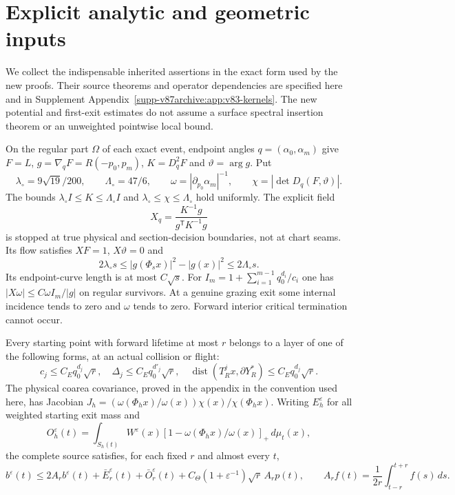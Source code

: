 \section{Explicit analytic and geometric inputs}
We collect the indispensable inherited assertions in the exact form
used by the new proofs. Their source theorems and operator dependencies
are specified here and in Supplement Appendix~\ref{supp-v87archive:app:v83-kernels}. The new
potential and first-exit estimates do not assume a surface spectral
insertion theorem or an unweighted pointwise local bound.

\begin{inputstatement}
\label{input:v83-geometric}
On the regular part $\Omega$ of each exact event, endpoint angles
$q=(\alpha_0,\alpha_m)$ give $F=L$, $g=\nabla_qF=R(-p_0,p_m)$,
$K=D_q^2F$ and $\vartheta=\arg g$. Put
\[
 \lambda_\circ=9\sqrt{19}/200,\qquad \Lambda_\circ=47/6,\qquad
 \omega=|\partial_{p_0}\alpha_m|^{-1},\qquad
 \chi=|\det D_q(F,\vartheta)|.
\]
The bounds $\lambda_\circ I\le K\le\Lambda_\circ I$ and
$\lambda_\circ\le\chi\le\Lambda_\circ$ hold uniformly.
The explicit field
\[
 X_q=\frac{K^{-1}g}{g^{\mathsf T}K^{-1}g}
\]
is stopped at true physical and section-decision boundaries, not at
chart seams. Its flow satisfies $XF=1$, $X\vartheta=0$ and
\begin{equation}\label{eq:v83-radial-input}
 2\lambda_\circ s\le |g(\Phi_sx)|^2-|g(x)|^2
                                      \le2\Lambda_\circ s.
\end{equation}
Its endpoint-curve length is at most $C\sqrt s$. For
$I_m=1+\sum_{i=1}^{m-1}q_0^{d_i}/c_i$ one has
$|X\omega|\le C\omega I_m/|g|$ on regular survivors. At a genuine
grazing exit some internal incidence tends to zero and $\omega$ tends
to zero. Forward interior critical termination cannot occur.

Every starting point with forward lifetime at most $r$ belongs to a
layer of one of the following forms, at an actual collision or flight:
\begin{equation}\label{eq:v83-layer-input}
 c_j\le C_Eq_0^{d_j}\sqrt r,\quad
 \Delta_j\le C_Eq_0^{d'_j}\sqrt r,\quad
 \operatorname{dist}(T_R^jx,\partial Y_R^*)\le C_Eq_0^{d_j}\sqrt r.
\end{equation}
The physical coarea covariance, proved in the appendix in the convention
used here, has Jacobian $J_h=(\omega(\Phi_hx)/\omega(x))\chi(x)/\chi(\Phi_hx)$.
Writing $E_h^\varepsilon$ for all weighted starting exit mass and
\[
 O_h^\varepsilon(t)=\int_{S_h(t)} W^\varepsilon(x)
            [1-\omega(\Phi_hx)/\omega(x)]_+\,d\mu_t(x),
\]
the complete source satisfies, for each fixed $r$ and almost every $t$,
\begin{equation}\label{eq:v83-shift-input}
 b^\varepsilon(t)\le2A_rb^\varepsilon(t)+\bar E_r^\varepsilon(t)
       +\bar O_r^\varepsilon(t)
       +C_\Theta(1+\varepsilon^{-1})\sqrt r\,A_rp(t),
 \qquad A_rf(t)=\frac1{2r}\int_{t-r}^{t+r}f(s)\,ds.
\end{equation}
\end{inputstatement}
